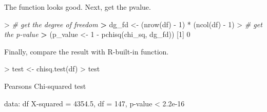 \documentclass[
]{article}
\newenvironment{Shaded}{\begin{snugshade}}{\end{snugshade}}
\newcommand{\AttributeTok}[1]{\textcolor[rgb]{0.77,0.63,0.00}{#1}}
\newcommand{\CommentTok}[1]{\textcolor[rgb]{0.56,0.35,0.01}{\textit{#1}}}
\newcommand{\DecValTok}[1]{\textcolor[rgb]{0.00,0.00,0.81}{#1}}
\newcommand{\ErrorTok}[1]{\textcolor[rgb]{0.64,0.00,0.00}{\textbf{#1}}}
\newcommand{\FloatTok}[1]{\textcolor[rgb]{0.00,0.00,0.81}{#1}}
\newcommand{\FunctionTok}[1]{\textcolor[rgb]{0.00,0.00,0.00}{#1}}
\newcommand{\NormalTok}[1]{#1}
\newcommand{\OtherTok}[1]{\textcolor[rgb]{0.56,0.35,0.01}{#1}}
\newcommand{\SpecialCharTok}[1]{\textcolor[rgb]{0.00,0.00,0.00}{#1}}
\newcommand{\StringTok}[1]{\textcolor[rgb]{0.31,0.60,0.02}{#1}}
\begin{document}
\begin{Shaded}
\end{Shaded}

The function looks good. Next, get the pvalue.

\begin{Shaded}
\begin{Highlighting}[]
\SpecialCharTok{\textgreater{}} \CommentTok{\# get the degree of freedom}
\ErrorTok{\textgreater{}}\NormalTok{ dg\_fd }\OtherTok{\textless{}{-}}\NormalTok{ (}\FunctionTok{nrow}\NormalTok{(df) }\SpecialCharTok{{-}} \DecValTok{1}\NormalTok{) }\SpecialCharTok{*}\NormalTok{ (}\FunctionTok{ncol}\NormalTok{(df) }\SpecialCharTok{{-}} \DecValTok{1}\NormalTok{)}
\SpecialCharTok{\textgreater{}} \CommentTok{\# get the p{-}value}
\ErrorTok{\textgreater{}}\NormalTok{ (p\_value }\OtherTok{\textless{}{-}} \DecValTok{1} \SpecialCharTok{{-}} \FunctionTok{pchisq}\NormalTok{(chi\_sq, dg\_fd))}
\NormalTok{[}\DecValTok{1}\NormalTok{] }\DecValTok{0}
\end{Highlighting}
\end{Shaded}

Finally, compare the result with R-built-in function.

\begin{Shaded}
\begin{Highlighting}[]
\SpecialCharTok{\textgreater{}}\NormalTok{ test }\OtherTok{\textless{}{-}} \FunctionTok{chisq.test}\NormalTok{(df)}
\SpecialCharTok{\textgreater{}}\NormalTok{ test}

\NormalTok{    Pearson}\StringTok{\textquotesingle{}s Chi{-}squared test}

\StringTok{data:  df}
\StringTok{X{-}squared = 4354.5, df = 147, p{-}value \textless{} 2.2e{-}16}
\end{Highlighting}
\end{Shaded}
\end{document}
